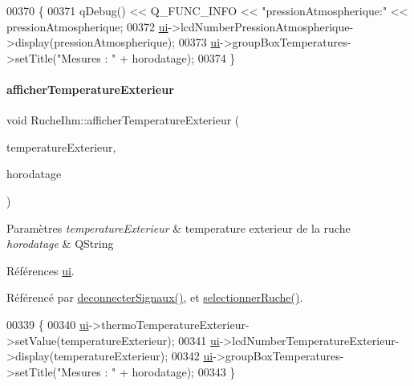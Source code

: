 \begin{DoxyCode}
00370 \{
00371      qDebug() << Q\_FUNC\_INFO << \textcolor{stringliteral}{"pressionAtmospherique:"} << pressionAtmospherique;
00372      \hyperlink{class_ruche_ihm_a64786058bd7f88ca2f1e9743bb27c25b}{ui}->lcdNumberPressionAtmospherique->display(pressionAtmospherique);
00373      \hyperlink{class_ruche_ihm_a64786058bd7f88ca2f1e9743bb27c25b}{ui}->groupBoxTemperatures->setTitle(\textcolor{stringliteral}{"Mesures : "} + horodatage);
00374 \}
\end{DoxyCode}
\mbox{\label{class_ruche_ihm_a63e3a82b98678d00d57748e80fe5258b}} 
\paragraph{\texorpdfstring{afficher\+Temperature\+Exterieur}{afficherTemperatureExterieur}}
{\footnotesize\ttfamily void Ruche\+Ihm\+::afficher\+Temperature\+Exterieur (\begin{DoxyParamCaption}\item[{double}]{temperature\+Exterieur,  }\item[{Q\+String}]{horodatage }\end{DoxyParamCaption})\hspace{0.3cm}{\ttfamily [slot]}}


\begin{DoxyParams}{Paramètres}
{\em temperature\+Exterieur} & temperature exterieur de la ruche \\
\hline
{\em horodatage} & Q\+String \\
\hline
\end{DoxyParams}


Références \hyperlink{class_ruche_ihm_a64786058bd7f88ca2f1e9743bb27c25b}{ui}.



Référencé par \hyperlink{class_ruche_ihm_a348a76106f3072dd31a382c6025b8113}{deconnecter\+Signaux()}, et \hyperlink{class_ruche_ihm_a7324ae6ea574ccdad47783f466933157}{selectionner\+Ruche()}.


\begin{DoxyCode}
00339 \{
00340     \hyperlink{class_ruche_ihm_a64786058bd7f88ca2f1e9743bb27c25b}{ui}->thermoTemperatureExterieur->setValue(temperatureExterieur);
00341     \hyperlink{class_ruche_ihm_a64786058bd7f88ca2f1e9743bb27c25b}{ui}->lcdNumberTemperatureExterieur->display(temperatureExterieur);
00342     \hyperlink{class_ruche_ihm_a64786058bd7f88ca2f1e9743bb27c25b}{ui}->groupBoxTemperatures->setTitle(\textcolor{stringliteral}{"Mesures : "} + horodatage);
00343 \}
\end{DoxyCode}
\mbox{\label{class_ruche_ihm_a4b8483705f88b46e253ef73068cd8f2e}} 
